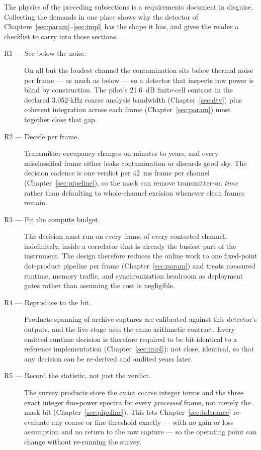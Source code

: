 The physics of the preceding subsections is a requirements document in disguise. Collecting the demands in one place shows why the detector of Chapters~\ref{sec:param}--\ref{sec:impl} has the shape it has, and gives the reader a checklist to carry into those sections.

\begin{description}
\item[R1 --- See below the noise.] On all but the loudest channel the contamination sits below thermal noise per frame --- as much as  below --- so a detector that inspects raw power is blind by construction. The pilot's 21.6~dB finite-cell contrast in the declared 3.052-kHz coarse analysis bandwidth (Chapter~\ref{sec:dtv}) plus coherent integration across each frame (Chapter~\ref{sec:param}) must together close that gap.
\item[R2 --- Decide per frame.] Transmitter occupancy changes on minutes to years, and every misclassified frame either leaks contamination or discards good sky. The decision cadence is one verdict per 42~ms frame per channel (Chapter~\ref{sec:pipeline}), so the mask can remove transmitter-on \emph{time} rather than defaulting to whole-channel excision whenever clean frames remain.
\item[R3 --- Fit the compute budget.] The decision must run on every frame of every contested channel, indefinitely, inside a correlator that is already the busiest part of the instrument. The design therefore reduces the online work to one fixed-point dot-product pipeline per frame (Chapter~\ref{sec:param}) and treats measured runtime, memory traffic, and synchronization headroom as deployment gates rather than assuming the cost is negligible.
\item[R4 --- Reproduce to the bit.] Products spanning  of archive captures are calibrated against this detector's outputs, and the live stage uses the same arithmetic contract. Every emitted runtime decision is therefore required to be bit-identical to a reference implementation (Chapter~\ref{sec:impl}): not close, identical, so that any decision can be re-derived and audited years later.
\item[R5 --- Record the statistic, not just the verdict.] The survey products store the exact coarse integer terms and the three exact integer fine-power spectra for every \emph{processed} frame, not merely the mask bit (Chapter~\ref{sec:pipeline}). This lets Chapter~\ref{sec:tolerance} re-evaluate any coarse or fine threshold exactly --- with no gain or loss assumption and no return to the raw capture --- so the operating point can change without re-running the survey.
\end{description}

